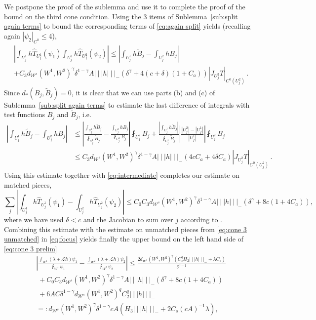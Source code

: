 \documentclass{amsart}
\numberwithin{equation}{section}
\newcommand\cL{{\mathcal L}}
\newcommand\cW{{\mathcal W}}
\newcommand{\tri}{{|\:\!\!|\:\!\!|}}
\newcommand{\hT}{\widehat{T}}
\begin{document}
We postpone the proof of the sublemma and use it to complete the proof of the bound on the third cone condition.
Using the 3 items of Sublemma~\ref{sub:split again terms} to bound the corresponding terms of
\eqref{eq:again split} yields (recalling again $|\psi_2|_{C^0} \le 4$),
\begin{equation}
\label{eq:intermediate}
\begin{split}
&\left| \int_{U^1_j} h \hT_{U^1_j}(\psi_1)  \int_{U^2_j} h \hT_{U^2_j}(\psi_2) \right|
\le \left| \int_{U^1_j} h \tilde B_j - \int_{U^2_j} h B_j \right| \\
&+ C_3 d_{\cW^s}(W^1, W^2)^\gamma \delta^{1-\gamma} A \tri h \tri_- \left( \delta^\gamma 
+ 4 (c+\delta) (1 + C_a)  \right)
|J_{U^2_j}T|_{C^0(U^2_j)}  \, .
\end{split}
\end{equation}
Since $d_*(B_j, \tilde B_j) = 0$, it is clear that we can use parts (b) and (c) of Sublemma~\ref{sub:split again terms}
to estimate the last difference of integrals with test functions $B_j$ and $\tilde B_j$, i.e.
\[
\begin{split}
\left| \int_{U^1_j} h \tilde B_j - \int_{U^2_j} h B_j \right| 
& \le \left| \frac{\int_{U^1_j} h  \tilde B_j }{\fint_{U^1_j} \tilde B_j}
- \frac{\int_{U^2_j} h  B_j }{\fint_{U^2_j} B_j} \right| \fint_{U^2_j} B_j
+ \frac{ \left| \int_{U^1_j} h \tilde B_j \right|}{\fint_{U^1_j}  \tilde B_j}
\left| \frac{|U^2_j| - |U^1_j|}{|U^1_j|} \right| \fint_{U^2_j} B_j \\
& \le C_3 d_{\cW^s}(W^1, W^2)^\gamma \delta^{1-\gamma} A \tri h \tri_- \left( 4cC_a + 4 \delta C_a \right) |J_{U^2_j}T|_{C^0(U^2_j)} \, .
\end{split}
\]
Using this estimate together with \eqref{eq:intermediate} completes our estimate on matched pieces,
\[
\sum_j \left| \int_{U^1_j} h \hT_{U^1_j}(\psi_1)  - \int_{U^2_j} h \hT_{U^2_j}(\psi_2) \right|
\le C_0 C_3 d_{\cW^s}(W^1, W^2)^\gamma \delta^{1-\gamma} A \tri h \tri_- \left( \delta^\gamma + 8 c(1+4C_a)  \right)  ,
\]
where we have used $\delta<c$ and the Jacobian to sum over $j$ according to \cite[Lemma~3.3]{DL22}.
Combining this estimate with the estimate on unmatched pieces from \eqref{eq:cone 3 unmatched} in \eqref{eq:focus} yields
finally the upper bound on the left hand side of \eqref{eq:cone 3 prelim}
\begin{equation}
\label{eq:finally}
\begin{split}
& \left|\frac{\int_{W^1} (\lambda + \cL h ) \psi_1}{\fint_{W^1}\psi_1} -\frac{\int_{W^2} (\lambda+  \cL h) \psi_2}{\fint_{W^2}\psi_2} \right|
 \le  \frac{2d_{\cW^s}(W^1, W^2)^\gamma \left(  C_s^q H_2 \tri h \tri_- + \lambda C_s \right) }{\delta^{\gamma-1}}\\
 & \; + C_0 C_3 d_{\cW^s}(W^1, W^2)^\gamma \delta^{1-\gamma} A \tri h \tri_- \left( \delta^\gamma + 8c (1+4C_a)  \right) \\
 & \; + 6 A C \delta^{1-\gamma} d_{\cW^s}(W^1, W^2)^q C_2^q \tri h \tri_- \\
&  =: d_{\cW^s}(W^1, W^2)^\gamma \delta^{1-\gamma} c A \left( H_3 \tri h \tri_- + 2C_s (cA)^{-1}\lambda \right)  ,
\end{split}
\end{equation}
\end{document}
